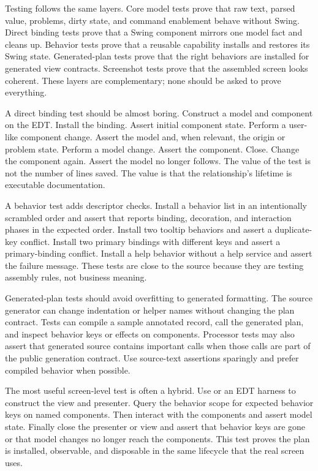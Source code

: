 Testing follows the same layers. Core model tests prove that raw text, parsed
value, problems, dirty state, and command enablement behave without Swing.
Direct binding tests prove that a Swing component mirrors one model fact and
cleans up. Behavior tests prove that a reusable capability installs and
restores its Swing state. Generated-plan tests prove that the right behaviors
are installed for generated view contracts. Screenshot tests prove that the
assembled screen looks coherent. These layers are complementary; none should
be asked to prove everything.

A direct binding test should be almost boring. Construct a model and component
on the EDT. Install the binding. Assert initial component state. Perform a
user-like component change. Assert the model and, when relevant, the origin or
problem state. Perform a model change. Assert the component. Close. Change the
component again. Assert the model no longer follows. The value of the test is
not the number of lines saved. The value is that the relationship's lifetime is
executable documentation.

A behavior test adds descriptor checks. Install a behavior list in an
intentionally scrambled order and assert that 
reports binding, decoration, and interaction phases in the expected order.
Install two tooltip behaviors and assert a duplicate-key conflict. Install two
primary bindings with different keys and assert a primary-binding conflict.
Install a help behavior without a help service and assert the failure message.
These tests are close to the source because they are testing assembly rules,
not business meaning.

Generated-plan tests should avoid overfitting to generated formatting. The
source generator can change indentation or helper names without changing the
plan contract. Tests can compile a sample annotated record, call the generated
plan, and inspect behavior keys or effects on components. Processor tests may
also assert that generated source contains important calls when those calls are
part of the public generation contract. Use source-text assertions sparingly
and prefer compiled behavior when possible.

The most useful screen-level test is often a hybrid. Use 
or an EDT harness to construct the view and presenter. Query the behavior scope
for expected behavior keys on named components. Then interact with the
components and assert model state. Finally close the presenter or view and
assert that behavior keys are gone or that model changes no longer reach the
components. This test proves the plan is installed, observable, and disposable
in the same lifecycle that the real screen uses.

